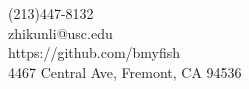 \documentclass[margin,line]{resume}
\begin{document}
{
	\sc
    \hfill (213)447-8132                  		  \vspace{0mm}\\\vspace{0mm}%
    \hfill zhikunli@usc.edu            		      \vspace{0mm}\\\vspace{0mm}%
    \hfill https://github.com/bmyfish             \vspace{0mm}\\\vspace{0mm}%
    \hfill 4467 Central Ave, Fremont, CA 94536     \vspace{0mm}\\\vspace{-10mm}%

}
\vspace{1mm}
\end{document}
